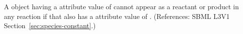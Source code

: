 A \Species object having a  attribute value of
 cannot appear as a reactant or product in any reaction if that
\Species also has a  attribute value of .
(References: SBML L3V1 Section~\ref{sec:species-constant}.)
